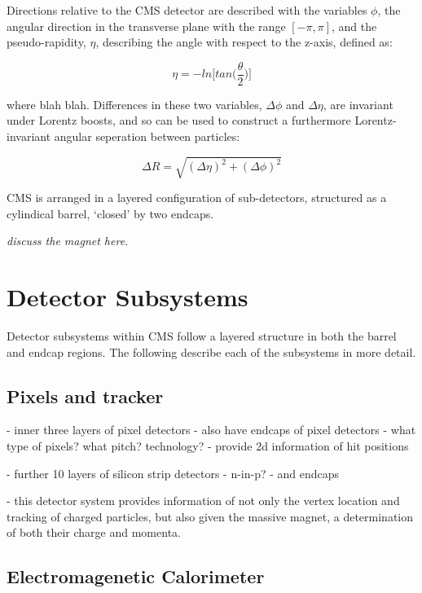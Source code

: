 Directions relative to the CMS detector are described with the variables $\phi$,
the angular direction in the transverse plane with the range $[-\pi, \pi]$, and 
the pseudo-rapidity, $\eta$, describing the angle with respect to the z-axis,
defined as:

\begin{equation}
\eta = - ln \Bigg[ tan \Bigg( \frac{\theta}{2} \Bigg) \Bigg]
\end{equation}

where blah blah. Differences in these two variables, $\Delta \phi$ and $\Delta 
\eta$, are invariant under Lorentz boosts, and so can be used to construct a 
furthermore Lorentz-invariant angular seperation between particles:

\begin{equation}
\Delta R = \sqrt{ (\Delta \eta)^2 + (\Delta \phi)^2}
\end{equation}

CMS is arranged in a layered configuration of sub-detectors, structured as a 
cylindical barrel, `closed' by two endcaps.

\emph{discuss the magnet here.}

\section{Detector Subsystems}  %
\label{sec:detector_subsystems}

Detector subsystems within CMS follow a layered structure in both the barrel and
endcap regions. The following describe each of the subsystems in more detail.

\subsection{Pixels and tracker}
- inner three layers of pixel detectors
    - also have endcaps of pixel detectors
- what type of pixels? what pitch? technology?
- provide 2d information of hit positions

- further 10 layers of silicon strip detectors
    - n-in-p?
    - and endcaps

- this detector system provides information of not only the vertex location and 
tracking of charged particles, but also given the massive magnet, a 
determination of both their charge and momenta.

\subsection{Electromagenetic Calorimeter}

